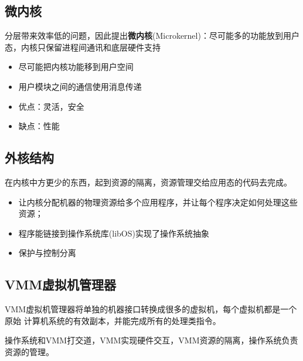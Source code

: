 \subsection{微内核}
分层带来效率低的问题，因此提出\textbf{微内核}(Microkernel)：尽可能多的功能放到用户态，内核只保留进程间通讯和底层硬件支持
\begin{itemize}
	\item 尽可能把内核功能移到用户空间
	\item 用户模块之间的通信使用消息传递
	\item 优点：灵活，安全
	\item 缺点：性能
\end{itemize}
\subsection{外核结构}
在内核中方更少的东西，起到资源的隔离，资源管理交给应用态的代码去完成。
\begin{itemize}
	\item 让内核分配机器的物理资源给多个应用程序，并让每个程序决定如何处理这些资源；
	\item 程序能链接到操作系统库(libOS)实现了操作系统抽象
	\item 保护与控制分离
\end{itemize}
\subsection{VMM虚拟机管理器}
VMM虚拟机管理器将单独的机器接口转换成很多的虚拟机，每个虚拟机都是一个原始
计算机系统的有效副本，并能完成所有的处理类指令。
\par 操作系统和VMM打交道，VMM实现硬件交互，VMM资源的隔离，操作系统负责资源的管理。

